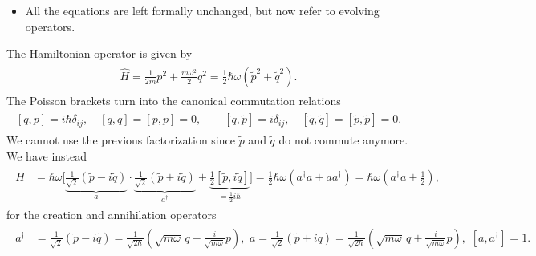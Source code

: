 \documentclass[../QFT_main.tex]{subfiles}
\begin{document}
\begin{mytheorem}
\begin{itemize}
    \item All the equations are left formally unchanged, but now refer to evolving operators.
\end{itemize}
%
The Hamiltonian operator is given by
{\small\begin{align}\label{eq:quantum_harmonic_oscillator_hamiltonian}
\begin{aligned}
    \hat{H} = \tfrac{1}{2m}{p}^2 + \tfrac{m\omega^2}{2} {q}^2= \tfrac{1}{2}\hbar \omega \left( {\tilde{p}}^2 + {\tilde{q}}^2 \right).
\end{aligned}\end{align}}
The Poisson brackets turn into the canonical commutation relations
{\small\begin{align}\label{eq:harmonic_oscillator_canonical_commutators}
\begin{aligned}
    [q,p]=i\hbar \delta_{ij} ,\quad [q,q]=[p,p]=0,
    \qquad
    [\tilde{q}, \tilde{p}] = i \delta_{ij},\quad [\tilde{q}, \tilde{q}] = [\tilde{p}, \tilde{p}] = 0.
\end{aligned}\end{align}}
We cannot use the previous factorization since $\tilde{p}$ and $\tilde{q}$ do not commute anymore.
We have instead
{\small\begin{align}\label{eq:harmonic_oscillator_ladder_hamiltonian}
\begin{aligned}
    \hat{H} &=
    \hbar \omega \bigg[
        \underbrace{\tfrac{1}{\sqrt{2}}\left( \tilde{p} - i \tilde{q} \right)}_{a}
        \cdot
        \underbrace{\tfrac{1}{\sqrt{2}}\left( \tilde{p} + i \tilde{q} \right)}_{a^{\dagger}}
        + \underbrace{\tfrac{1}{2}[\tilde{p}, i\tilde{q}]}_{=\tfrac{1}{2} i \hbar}
    \Big] = \tfrac{1}{2}\hbar\omega \left(a^\dagger a+ a a^\dagger\right)
    = \hbar \omega \left( a^{\dagger} a + \tfrac{1}{2} \right),
\end{aligned}\end{align}}
for the creation and annihilation operators
{\small\begin{align}\label{eq:ordinary_QM_harmonic_oscillator}
\begin{aligned}
    a^\dagger &= \tfrac{1}{\sqrt{2}}\left( \tilde{p} - i \tilde{q} \right) = \tfrac{1}{\sqrt{2\hbar}} \left(\sqrt{m\omega} \,q - \tfrac{i}{\sqrt{m\omega}} p \right), \,\,
    a = \tfrac{1}{\sqrt{2}}\left( \tilde{p} + i \tilde{q} \right) = \tfrac{1}{\sqrt{2\hbar}} \left( \sqrt{m\omega}\, q + \tfrac{i}{\sqrt{m\omega}} p \right),\,\, [a, a^\dagger] = 1.
\end{aligned}\end{align}}

\end{mytheorem}
\end{document}
